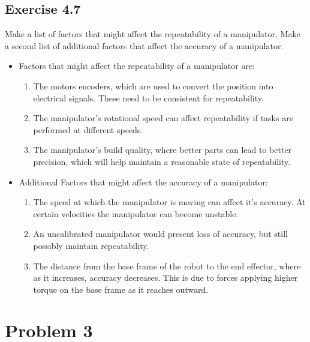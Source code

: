 \documentclass[10pt]{article}
\begin{document}
\subsection*{Exercise 4.7}
Make a list of factors that might affect the repeatability of a manipulator. Make a second list of additional factors that affect the accuracy of a manipulator.
\begin{itemize}
\item Factors that might affect the repeatability of a manipulator are:
\begin{enumerate}
\item The motors encoders, which are used to convert the position into electrical signals.  These need to be consistent for repeatability.
\item The manipulator's rotational speed can affect repeatability if tasks are performed at different speeds.
\item The manipulator's build quality, where better parts can lead to better precision, which will help maintain a reasonable state of repeatability.
\end{enumerate}
\item Additional Factors that might affect the accuracy of a manipulator:
\begin{enumerate}
\item The speed at which the manipulator is moving can affect it's accuracy.  At certain velocities the manipulator can become unstable.
\item An uncalibrated manipulator would present loss of accuracy, but still possibly maintain repeatability.
\item The distance from the base frame of the robot to the end effector, where as it increases, accuracy decreases.  This is due to forces applying higher torque on the base frame as it reaches outward.
\end{enumerate}
\end{itemize}
\pagebreak
\section*{Problem 3} %
\end{document}
